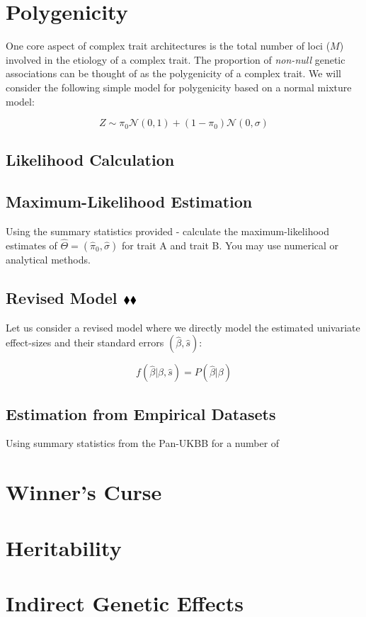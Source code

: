 \documentclass{pset}
\date{6/1/2025}
\begin{document}
\maketitle

\section{Polygenicity}

One core aspect of complex trait architectures is the total number of loci ($M$) involved in the etiology of a complex trait. The proportion of \textit{non-null} genetic associations can be thought of as the polygenicity of a complex trait. We will consider the following simple model for polygenicity based on a normal mixture model:  

$$Z \sim \pi_0 \mathcal{N}(0,1) + (1 - \pi_0)\mathcal{N}(0,\sigma)$$

\subsection*{Likelihood Calculation}


\subsection*{Maximum-Likelihood Estimation}

Using the summary statistics provided - calculate the maximum-likelihood estimates of $\hat{\Theta} = (\hat{\pi}_0, \hat{\sigma})$ for trait A and trait B. You may use numerical or analytical methods. 

\subsection*{Revised Model $\mathbin{\blacklozenge}\mathbin{\blacklozenge}$}

Let us consider a revised model where we directly model the estimated univariate effect-sizes and their standard errors $(\hat{\beta}, \hat{s})$:

$$f(\hat{\beta} | \beta, \hat{s}) = P(\hat{\beta} | \beta)$$



\subsection*{Estimation from Empirical Datasets}

Using summary statistics from the Pan-UKBB for a number of 




\section{Winner's Curse}




\section{Heritability}




\section{Indirect Genetic Effects}
\end{document}
